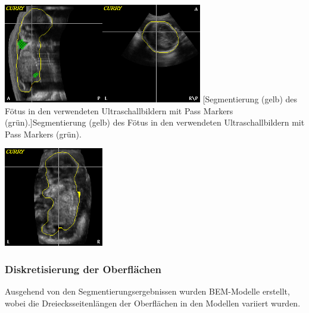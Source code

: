 \begin{center}
\includegraphics[width=4.339cm,height=4.339cm]{BA-img/BA-img1.png}\includegraphics[width=4.339cm,height=4.339cm]{BA-img/BA-img2.png}
[Segmentierung (gelb) des Fötus in den verwendeten
Ultraschallbildern mit Pass Markers (grün).]{Segmentierung (gelb) des
Fötus in den verwendeten Ultraschallbildern mit Pass Markers (grün).}

\end{center}
\begin{center}
\includegraphics[width=4.339cm,height=4.339cm]{BA-img/BA-img3.png}
\end{center}
\subsubsection{Diskretisierung der Oberflächen}
Ausgehend von den Segmentierungsergebnissen wurden BEM-Modelle erstellt,
wobei die Dreiecksseitenlängen der Oberflächen in den Modellen variiert
wurden. 



